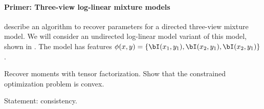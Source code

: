 \paragraph{Primer: Three-view log-linear mixture models}

\citet{anandkumar12moments} describe an algorithm to recover parameters
  for a directed three-view mixture model. 
We will consider an undirected log-linear model variant of this model,
  shown in .
The model has features $\phi(x,y) = \{\bI(x_1,y_1), \bI(x_2,y_1), \bI(x_2,y_1)\}$.

Recover moments with tensor factorization.
Show that the constrained optimization problem is convex.

Statement: consistency.

